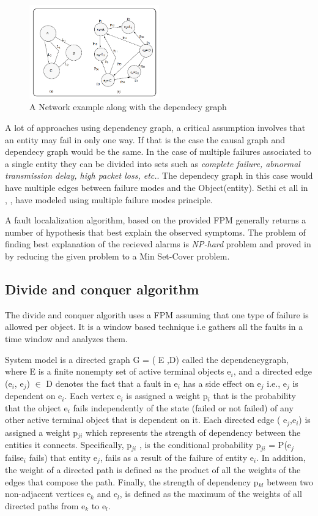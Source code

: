 \documentclass[10pt]{sigplan-proc-varsize}
\begin{document}
\begin{figure}[h!]
  \caption{A Network example along with the dependecy graph \cite{Katzela:95}}
  \centering
    \includegraphics[width=0.5\textwidth]{Fig4}
\end{figure}

A lot of approaches using dependency graph, a critical assumption involves that an entity may fail in only one way. If that is the case the causal graph and dependecy graph would be the same.  In the case of multiple failures associated to a single entity they can be divided into sets such as {\it{complete failure, abnormal transmission delay, high packet loss, etc.}}. The dependecy graph in this case would have multiple edges between failure modes and the Object(entity). Sethi et all in \cite{Sethi:02}, \cite{Sethi:041}, \cite{Sethi:04} have modeled using multiple failure modes principle. 

A fault localalization algorithm, based on the provided FPM generally returns a number of hypothesis that best explain the observed symptoms. The problem of finding best explanation of the recieved alarms is {\it{NP-hard}} problem and proved in \cite{Katzela:95} by reducing the given problem to a Min Set-Cover problem.

\subsection{Divide and conquer algorithm}
The divide and conquer algorith uses a FPM assuming that one type of failure is allowed per object. It is a window based technique i.e gathers all the faults in a time window and analyzes them. 

System model is a directed graph G = ( E ,D) called the dependencygraph, where E is a finite nonempty set of active terminal objects e$_i$, and a directed edge (e$_i$, e$_j$) $\in$ D denotes the fact that a fault in e$_i$ has a side effect on e$_j$ i.e., e$_j$ is dependent on e$_i$.
Each vertex e$_i$ is assigned a weight p$_i$ that is the probability that the object e$_i$ fails independently of the state (failed or not failed) of any other active terminal object that is dependent on it. Each directed edge ( e$_j$,e$_i$) is assigned a weight p$_{ji}$ which represents the strength of dependency between the entities it connects. Specifically, p$_{ji}$ , is the conditional probability p$_{ji}$ = P(e$_j$ fails\textbar e$_i$ fails) that entity e$_j$, fails as a result of the failure of entity e$_i$. In addition, the weight of a directed path is defined as the product of all the weights of the edges that compose the path. Finally, the strength of dependency p$_{kl}$ between two non-adjacent vertices e$_k$ and e$_l$, is defined as the maximum of the weights of all directed paths from e$_k$ to e$_l$.
\end{document}

